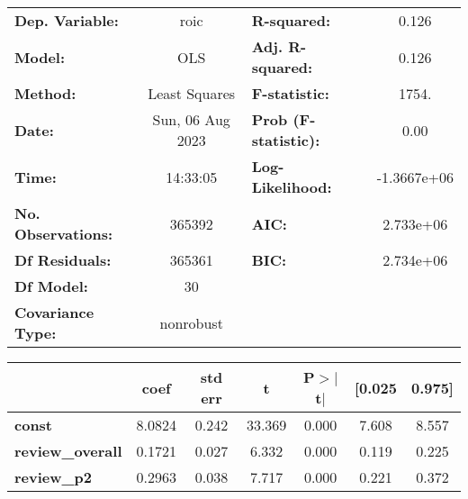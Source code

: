 \begin{center}
\begin{tabular}{lclc}
\toprule
\textbf{Dep. Variable:}                                               &       roic       & \textbf{  R-squared:         } &      0.126   \\
\textbf{Model:}                                                       &       OLS        & \textbf{  Adj. R-squared:    } &      0.126   \\
\textbf{Method:}                                                      &  Least Squares   & \textbf{  F-statistic:       } &      1754.   \\
\textbf{Date:}                                                        & Sun, 06 Aug 2023 & \textbf{  Prob (F-statistic):} &      0.00    \\
\textbf{Time:}                                                        &     14:33:05     & \textbf{  Log-Likelihood:    } & -1.3667e+06  \\
\textbf{No. Observations:}                                            &      365392      & \textbf{  AIC:               } &  2.733e+06   \\
\textbf{Df Residuals:}                                                &      365361      & \textbf{  BIC:               } &  2.734e+06   \\
\textbf{Df Model:}                                                    &          30      & \textbf{                     } &              \\
\textbf{Covariance Type:}                                             &    nonrobust     & \textbf{                     } &              \\
\bottomrule
\end{tabular}
\begin{tabular}{lcccccc}
                                                                      & \textbf{coef} & \textbf{std err} & \textbf{t} & \textbf{P$> |$t$|$} & \textbf{[0.025} & \textbf{0.975]}  \\
\midrule
\textbf{const}                                                        &       8.0824  &        0.242     &    33.369  &         0.000        &        7.608    &        8.557     \\
\textbf{review\_overall}                                              &       0.1721  &        0.027     &     6.332  &         0.000        &        0.119    &        0.225     \\
\textbf{review\_p2}                                                   &       0.2963  &        0.038     &     7.717  &         0.000        &        0.221    &        0.372     \\

\end{tabular}
\end{center}
